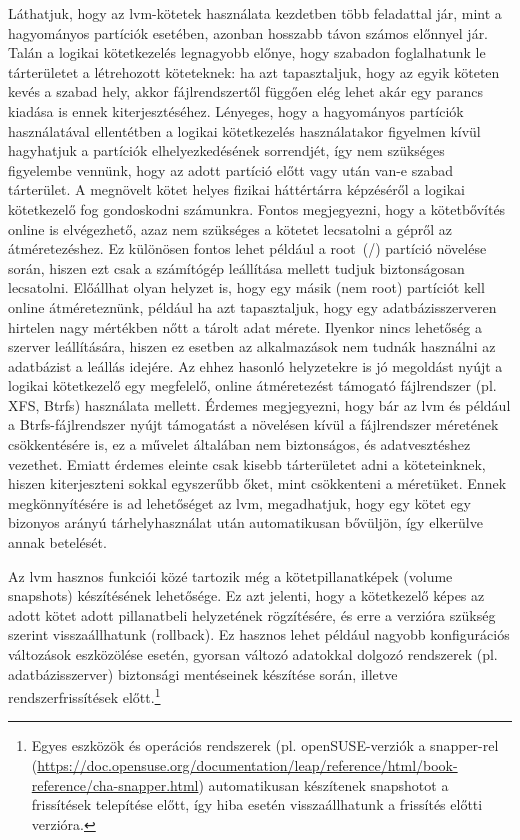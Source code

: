 Láthatjuk, hogy az \acrshort{lvm}-kötetek használata kezdetben több feladattal jár, mint a hagyományos partíciók esetében, azonban hosszabb távon számos előnnyel jár. Talán a logikai kötetkezelés legnagyobb előnye, hogy szabadon foglalhatunk le tárterületet a létrehozott köteteknek: ha azt tapasztaljuk, hogy az egyik köteten kevés a szabad hely, akkor fájlrendszertől függően elég lehet akár egy parancs kiadása is ennek kiterjesztéséhez. Lényeges, hogy a hagyományos partíciók használatával ellentétben a logikai kötetkezelés használatakor figyelmen kívül hagyhatjuk a partíciók elhelyezkedésének sorrendjét, így nem szükséges figyelembe vennünk, hogy az adott partíció előtt vagy után van-e szabad tárterület. A megnövelt kötet helyes fizikai háttértárra képzéséről a logikai kötetkezelő fog gondoskodni számunkra. Fontos megjegyezni, hogy a kötetbővítés online is elvégezhető, azaz nem szükséges a kötetet lecsatolni a gépről az átméretezéshez. Ez különösen fontos lehet például a root~(/) partíció növelése során, hiszen ezt csak a számítógép leállítása mellett tudjuk biztonságosan lecsatolni. Előállhat olyan helyzet is, hogy egy másik (nem root) partíciót kell online átméreteznünk, például ha azt tapasztaljuk, hogy egy adatbázisszerveren hirtelen nagy mértékben nőtt a tárolt adat mérete. Ilyenkor nincs lehetőség a szerver leállítására, hiszen ez esetben az alkalmazások nem tudnák használni az adatbázist a leállás idejére. Az ehhez hasonló helyzetekre is jó megoldást nyújt a logikai kötetkezelő egy megfelelő, online átméretezést támogató fájlrendszer (pl. XFS, Btrfs) használata mellett. Érdemes megjegyezni, hogy bár az \acrshort{lvm} és például a Btrfs-fájlrendszer nyújt támogatást a növelésen kívül a fájlrendszer méretének csökkentésére is, ez a művelet általában nem biztonságos, és adatvesztéshez vezethet. Emiatt érdemes eleinte csak kisebb tárterületet adni a köteteinknek, hiszen kiterjeszteni sokkal egyszerűbb őket, mint csökkenteni a méretüket. Ennek megkönnyítésére is ad lehetőséget az \acrshort{lvm}, megadhatjuk, hogy egy kötet egy bizonyos arányú tárhelyhasználat után automatikusan bővüljön, így elkerülve annak betelését.

Az \acrshort{lvm} hasznos funkciói közé tartozik még a kötetpillanatképek (volume snapshots) készítésének lehetősége. Ez azt jelenti, hogy a kötetkezelő képes az adott kötet adott pillanatbeli helyzetének rögzítésére, és erre a verzióra szükség szerint visszaállhatunk (rollback). Ez hasznos lehet például nagyobb konfigurációs változások eszközölése esetén, gyorsan változó adatokkal dolgozó rendszerek (pl. adatbázisszerver) biztonsági mentéseinek készítése során, illetve rendszerfrissítések előtt.\footnote{Egyes eszközök és operációs rendszerek (pl. openSUSE-verziók a snapper-rel (\url{https://doc.opensuse.org/documentation/leap/reference/html/book-reference/cha-snapper.html}) automatikusan készítenek snapshotot a frissítések telepítése előtt, így hiba esetén visszaállhatunk a frissítés előtti verzióra.}



